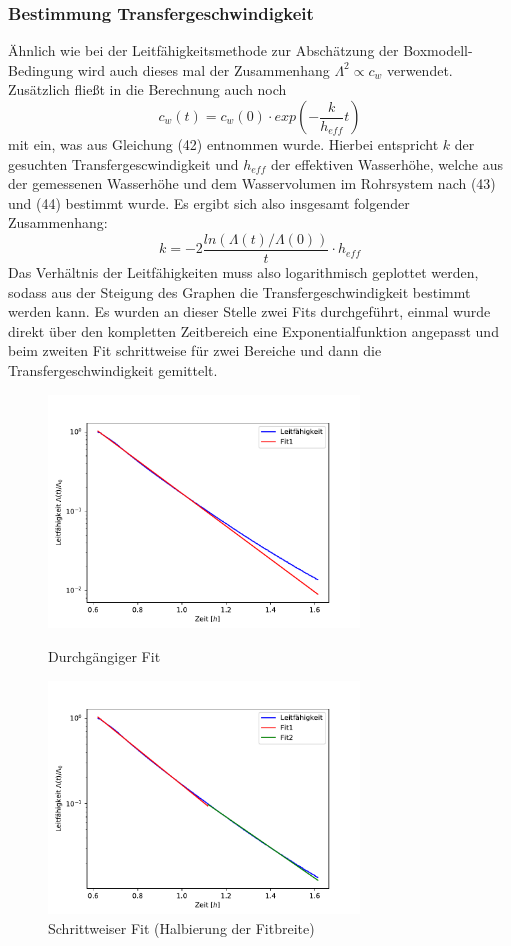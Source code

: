 \documentclass[12pt]{article}
\begin{document}
\subsubsection{Bestimmung Transfergeschwindigkeit}

Ähnlich wie bei der Leitfähigkeitsmethode zur Abschätzung der Boxmodell-Bedingung wird auch dieses mal der Zusammenhang $\Lambda ^2 \propto c_w $ verwendet. Zusätzlich fließt in die Berechnung auch noch 
\begin{equation}
c_w(t) = c_w(0) \cdot exp(-\frac{k}{h_{eff}}t)
\end{equation}
mit ein, was aus Gleichung (42) \cite{jaehne} entnommen wurde. Hierbei entspricht $k$ der gesuchten Transfergescwindigkeit und $h_{eff}$ der effektiven Wasserhöhe, welche aus der gemessenen Wasserhöhe und dem Wasservolumen im Rohrsystem nach (43) und (44) \cite{jaehne} bestimmt wurde. Es ergibt sich also insgesamt folgender Zusammenhang:
\begin{equation}
k = -2 \frac{ln(\Lambda (t)/\Lambda (0))}{t} \cdot h_{eff} 
\end{equation}
Das Verhältnis der Leitfähigkeiten muss also logarithmisch geplottet werden, sodass aus der Steigung des Graphen die Transfergeschwindigkeit bestimmt werden kann. Es wurden an dieser Stelle zwei Fits durchgeführt, einmal wurde direkt über den kompletten Zeitbereich eine Exponentialfunktion angepasst und beim zweiten Fit schrittweise für zwei Bereiche und dann die Transfergeschwindigkeit gemittelt.

\begin{figure}[H]
	\centering
	\parbox{82.5mm}{
		\centering
		\includegraphics[width=82.5mm]{VE-Wasser/TransferGeschw}
		\caption{Durchgängiger Fit}
	}
	\hfill%
	\parbox{82.5mm}{
		\centering
		\includegraphics[width=82.5mm]{VE-Wasser/TransferGeschwKnick}
		\caption{Schrittweiser Fit (Halbierung der Fitbreite)}
	}
\end{figure}
\end{document}
